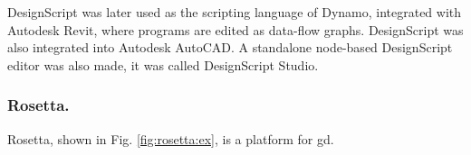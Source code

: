 \documentclass{./llncs2e/llncs}
\begin{document}
	
	DesignScript was later used as the scripting language of Dynamo, integrated with Autodesk Revit, where programs are edited as data-flow graphs. 
	DesignScript was also integrated into Autodesk AutoCAD. 
	A standalone node-based DesignScript editor was also made, it was called DesignScript Studio.
	


\subsubsection{Rosetta.}
	Rosetta\cite{de2012modern,lopes2011portable}, shown in Fig. \ref{fig:rosetta:ex}, is a platform for \ac{gd}.
	
\end{document}
